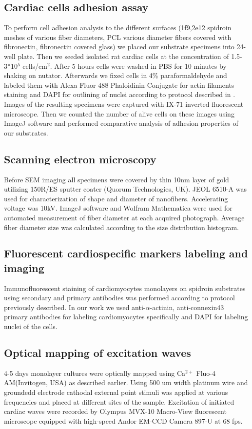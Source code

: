 \subsection{Cardiac cells adhesion assay}
To perform cell adhesion analysis to the different surfaces (1f9,2e12 spidroin meshes of various fiber diameters, PCL various diameter fibers covered with fibronectin, fibronectin covered glass) we placed our substrate specimens into 24-well plate.
Then we seeded isolated rat cardiac cells at the concentration of 1.5-3*10$^{5}$ cells/cm$^{2}$.
After 5 hours cells were washed in PBS for 10 minutes by shaking on nutator. 
Afterwards we fixed cells in 4\% paraformaldehyde and labeled them with Alexa Fluor 488 Phaloidinin Conjugate for actin filaments staining and DAPI for outlining of nuclei according to protocol described in \cite{Orlova2011}. 
Images of the resulting specimens were captured with IX-71 inverted fluorescent microscope. 
Then we counted the number of alive cells on these images using ImageJ software and performed comparative analysis of adhesion properties of our substrates.     
\subsection{Scanning electron microscopy}
Before SEM imaging all specimens were covered by thin 10nm layer of gold utilizing 150R/ES sputter coater (Quorum Technologies, UK).
JEOL 6510-A was used for characterization of shape and diameter of nanofibers. Accelerating voltage was 10kV.
ImageJ software and Wolfram Mathematica were used for automated measurement of fiber diameter at each acquired photograph.
Average fiber diameter size was calculated according to the size distribution histogram.
\subsection{Fluorescent cardiospecific markers labeling and imaging}      
Immunofluorescent staining of cardiomyocytes monolayers on spidroin substrates using secondary and primary antibodies was performed according to protocol previously described\cite{Bursac2002}.
In our work we used anti-$\alpha$-actinin, anti-connexin43 primary antibodies for labeling cardiomyocytes specifically and DAPI for labeling nuclei of the cells.
\subsection{Optical mapping of excitation waves}
4-5 days monolayer cultures were optically mapped using Ca$^{2+}$ Fluo-4 AM(Invitogen, USA) as described earlier\cite{Orlova2011}.
Using 500 um width platinum wire and groundedd electrode cathodal external point stimuli was applied at various frequencies and placed at different sites of the sample. 
Excitation of initiated cardiac waves were recorded by Olympus MVX-10 Macro-View fluorescent microscope equipped with high-speed Andor EM-CCD Camera 897-U at 68 fps.
